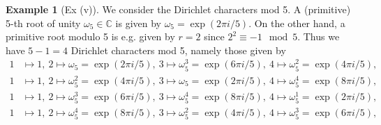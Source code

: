 \documentclass{scrartcl}
\newcommand{\C}{\mathbb{C}}
\theoremstyle{definition}
\newtheorem{example}[definition]{Example}
\begin{document}
\begin{example}[Ex (v)]
    We consider the Dirichlet characters mod 5.
    A (primitive) 5-th root of unity $\omega_5 \in \C$ is given by $\omega_5 = \exp(2\pi i/5)$.
    On the other hand, a primitive root modulo 5 is e.g. given by $r = 2$ since $2^2 \equiv -1 \mod 5$.
    Thus we have $5 - 1 = 4$ Dirichlet characters mod 5, namely those given by
    \begin{align*}
        1 &\mapsto 1,\ 2 \mapsto \omega_5 = \exp(2\pi i/5),\ 3 \mapsto \omega_5^3 = \exp(6\pi i/5),\ 4 \mapsto \omega_5^2 = \exp(4\pi i/5),\ \\
        1 &\mapsto 1,\ 2 \mapsto \omega_5^2 = \exp(4\pi i/5),\ 3 \mapsto \omega_5 = \exp(2\pi i/5),\ 4 \mapsto \omega_5^4 = \exp(8\pi i/5),\ \\
        1 &\mapsto 1,\ 2 \mapsto \omega_5^3 = \exp(6\pi i/5),\ 3 \mapsto \omega_5^4 = \exp(8\pi i/5),\ 4 \mapsto \omega_5^1 = \exp(2\pi i/5),\ \\
        1 &\mapsto 1,\ 2 \mapsto \omega_5^4 = \exp(8\pi i/5),\ 3 \mapsto \omega_5^2 = \exp(4\pi i/5),\ 4 \mapsto \omega_5^3 = \exp(6\pi i/5),\ \\
    \end{align*}
\end{example}
\end{document}
